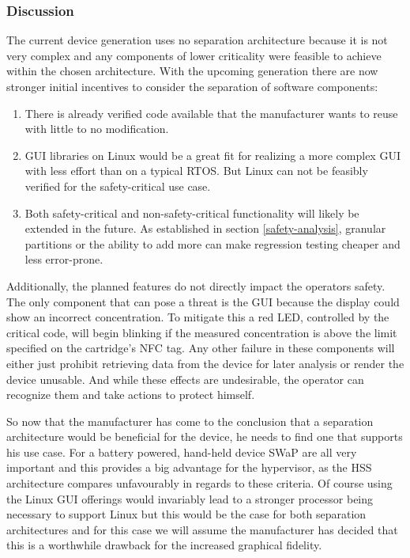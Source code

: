 \subsubsection{Discussion}
The current device generation uses no separation architecture because it is not very complex and any components of lower criticality were feasible to achieve within the chosen architecture. With the upcoming generation there are now stronger initial incentives to consider the separation of software components:
\begin{enumerate}
\item There is already verified code available that the manufacturer wants to reuse with little to no modification.
\item \gls{GUI} libraries on Linux would be a great fit for realizing a more complex \gls{GUI} with less effort than on a typical \gls{RTOS}. But Linux can not be feasibly verified for the safety-critical use case.
\item Both safety-critical and non-safety-critical functionality will likely be extended in the future. As established in section  \ref{safety-analysis}, granular partitions or the ability to add more can make regression testing cheaper and less error-prone.
\end{enumerate}
Additionally, the planned features do not directly impact the operators safety. The only component that can pose a threat is the \gls{GUI} because the display could show an incorrect concentration. To mitigate this a red \gls{LED}, controlled by the critical code, will begin blinking if the measured concentration is above the limit specified on the cartridge's \gls{NFC} tag. Any other failure in these components will either just prohibit retrieving data from the device for later analysis or render the device unusable. And while these effects are undesirable, the operator can recognize them and take actions to protect himself.

So now that the manufacturer has come to the conclusion that a separation architecture would be beneficial for the device, he needs to find one that supports his use case. For a battery powered, hand-held device \gls{SWaP} are all very important and this provides a big advantage for the hypervisor, as the \gls{HSS} architecture compares unfavourably in regards to these criteria. Of course using the Linux \gls{GUI} offerings would invariably lead to a stronger processor being necessary to support Linux but this would be the case for both separation architectures and for this case we will assume the manufacturer has decided that this is a worthwhile drawback for the increased graphical fidelity. 


